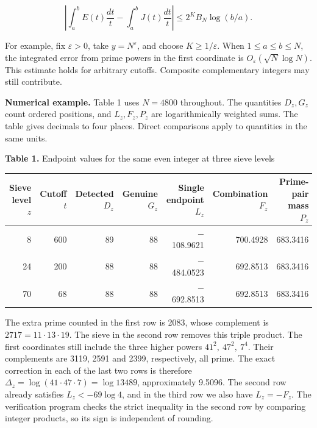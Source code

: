 \documentclass[11pt,a4paper]{article}
\begin{document}
\[
\left|\int_a^b E(t)\frac{dt}{t}-\int_a^b J(t)\frac{dt}{t}\right|
\le 2^K B_N\log(b/a).
\]

For example, fix $\varepsilon>0$, take $y=N^\varepsilon$, and choose $K\ge1/\varepsilon$. When $1\le a\le b\le N$, the integrated error from prime powers in the first coordinate is $O_\varepsilon(\sqrt N\log N)$. This estimate holds for arbitrary cutoffs. Composite complementary integers may still contribute.

\textbf{Numerical example.} Table 1 uses $N=4800$ throughout. The quantities $D_z,G_z$ count ordered positions, and $L_z,F_z,P_z$ are logarithmically weighted sums. The table gives decimals to four places. Direct comparisons apply to quantities in the same units.

\begin{center}\small
\textbf{Table 1.} Endpoint values for the same even integer at three sieve levels
\par\smallskip
\renewcommand{\arraystretch}{1.19}\setlength{\tabcolsep}{5pt}
\begin{tabular}{rrrrrrr}\hline
\shortstack[r]{Sieve level\\ $z$} & \shortstack[r]{Cutoff\\ $t$} & \shortstack[r]{Detected\\ $D_z$} & \shortstack[r]{Genuine\\ $G_z$} & \shortstack[r]{Single endpoint\\ $L_z$} & \shortstack[r]{Combination\\ $F_z$} & \shortstack[r]{Prime-pair mass\\ $P_z$} \\
\hline
8 & 600 & 89 & 88 & \ensuremath{-}108.9621 & 700.4928 & 683.3416 \\
24 & 200 & 88 & 88 & \ensuremath{-}484.0523 & 692.8513 & 683.3416 \\
70 & 68 & 88 & 88 & \ensuremath{-}692.8513 & 692.8513 & 683.3416 \\
\hline
\end{tabular}\end{center}

The extra prime counted in the first row is 2083, whose complement is $2717=11\cdot13\cdot19$. The sieve in the second row removes this triple product. The first coordinates still include the three higher powers $41^2,\ 47^2,\ 7^4$. Their complements are 3119, 2591 and 2399, respectively, all prime. The exact correction in each of the last two rows is therefore $\Delta_z=\log(41\cdot47\cdot7)=\log13489$, approximately 9.5096. The second row already satisfies $L_z<-69\log4$, and in the third row we also have $L_z=-F_z$. The verification program checks the strict inequality in the second row by comparing integer products, so its sign is independent of rounding.
\end{document}
